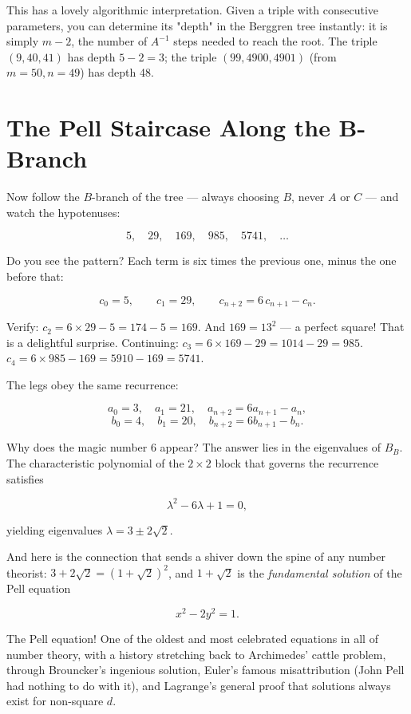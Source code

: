 \documentclass[11pt,twoside,openright]{book}
\theoremstyle{definition}
\theoremstyle{remark}
\begin{document}
This has a lovely algorithmic interpretation. Given a triple with consecutive parameters, you can determine its "depth" in the Berggren tree instantly: it is simply $m - 2$, the number of $A^{-1}$ steps needed to reach the root. The triple $(9, 40, 41)$ has depth $5 - 2 = 3$; the triple $(99, 4900, 4901)$ (from $m = 50, n = 49$) has depth 48.


\section{The Pell Staircase Along the B-Branch}

Now follow the $B$-branch of the tree --- always choosing $B$, never $A$ or $C$ --- and watch the hypotenuses:

\[5, \quad 29, \quad 169, \quad 985, \quad 5741, \quad \ldots\]

Do you see the pattern? Each term is six times the previous one, minus the one before that:

\[c_0 = 5, \qquad c_1 = 29, \qquad c_{n+2} = 6\,c_{n+1} - c_n.\]

Verify: $c_2 = 6 \times 29 - 5 = 174 - 5 = 169$. And $169 = 13^2$ --- a perfect square! That is a delightful surprise. Continuing: $c_3 = 6 \times 169 - 29 = 1014 - 29 = 985$. $c_4 = 6 \times 985 - 169 = 5910 - 169 = 5741$.

The legs obey the same recurrence:

\[a_0 = 3,\quad a_1 = 21,\quad a_{n+2} = 6a_{n+1} - a_n,\]
\[b_0 = 4,\quad b_1 = 20,\quad b_{n+2} = 6b_{n+1} - b_n.\]

Why does the magic number $6$ appear? The answer lies in the eigenvalues of $B_B$. The characteristic polynomial of the $2 \times 2$ block that governs the recurrence satisfies

\[\lambda^2 - 6\lambda + 1 = 0,\]

yielding eigenvalues $\lambda = 3 \pm 2\sqrt{2}$.

And here is the connection that sends a shiver down the spine of any number theorist: $3 + 2\sqrt{2} = (1 + \sqrt{2})^2$, and $1 + \sqrt{2}$ is the \textit{fundamental solution} of the Pell equation

\[x^2 - 2y^2 = 1.\]

The Pell equation! One of the oldest and most celebrated equations in all of number theory, with a history stretching back to Archimedes' cattle problem, through Brouncker's ingenious solution, Euler's famous misattribution (John Pell had nothing to do with it), and Lagrange's general proof that solutions always exist for non-square $d$.
\end{document}
